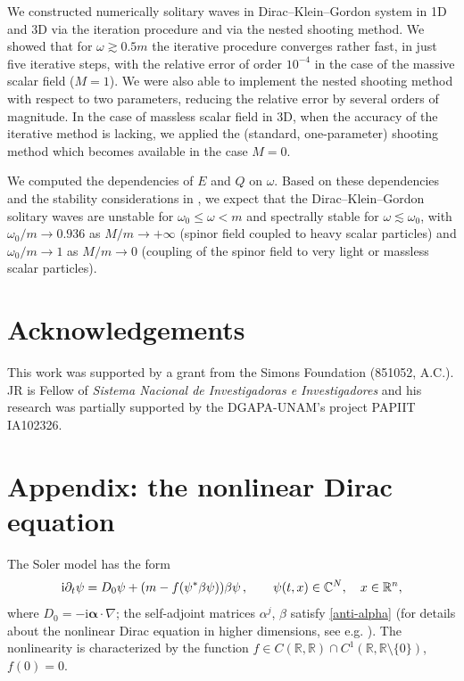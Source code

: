 \documentclass[12pt]{extarticle}
\newcommand{\jj}{\mathrm{i}}
\newcommand{\p}{\partial}
\def\R{\mathbb{R}}
\newcommand{\C}{\mathbb{C}}\newcommand{\Z}{\mathbb{Z}}
\theoremstyle{plain}
\theoremstyle{remark}
\begin{document}
We constructed numerically
solitary waves
in Dirac--Klein--Gordon system in
1D and 3D
via the iteration procedure
and via the nested shooting method.
We showed that
for $\omega\gtrsim 0.5m$
the iterative procedure converges rather fast,
in just five
iterative steps,
with the relative error
of order $10^{-4}$
in the case of the massive
scalar field ($M=1$).
We were also able to implement
the nested shooting method
with respect to two parameters,
reducing the
relative error
by several orders of magnitude.
In the case of massless scalar field in 3D,
when the accuracy of the iterative
method is lacking,
we applied
the (standard, one-parameter) shooting method
which
becomes available in the case $M=0$.

We computed the dependencies
of $E$ and $Q$ on $\omega$.
Based on these dependencies
and the stability considerations in
\cite{berkolaiko2015vakhitov},
we expect that the
Dirac--Klein--Gordon solitary waves
are unstable for $\omega_0\le \omega<m$
and spectrally stable
for $\omega\lesssim \omega_0$,
with $\omega_0/m\to 0.936$ as $M/m\to+\infty$
(spinor field coupled to heavy scalar particles)
and $\omega_0/m\to 1$ as $M/m\to 0$ (coupling of the spinor field to very light or massless scalar particles).


\section*{Acknowledgements}

This work was supported by a grant from the Simons Foundation (851052, A.C.). JR is Fellow of \emph{Sistema Nacional de Investigadoras e Investigadores} and his research was partially supported by the DGAPA-UNAM's project PAPIIT IA102326.



\appendix

\section{Appendix:
the nonlinear Dirac equation}
\label{sect-nld}


The Soler model
\cite{jetp.8.260,PhysRevD.1.2766}
has the form
\begin{equation}\label{nld}
\jj\p\sb{t}\psi
=D_0\psi+(m-f(\psi^*\beta\psi))\beta\psi\,,
\qquad
\psi(t,x)\in\C^N,
\quad
x\in\R^n,
\end{equation}
where $D_0=-\jj\bm\alpha\cdot\nabla$;
the self-adjoint matrices
$\alpha^j$, $\beta$
satisfy \eqref{anti-alpha}
(for details about the nonlinear
Dirac equation
in higher dimensions, see e.g. \cite{boussaid2019nonlinear}).
The nonlinearity
is characterized by the function
$f\in C(\R,\R)\cap C^1(\R,\R\setminus\{0\})$,
$f(0)=0$.
\end{document}
